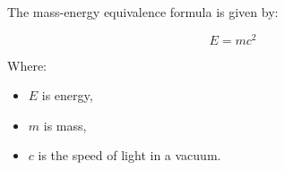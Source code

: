 \documentclass{article}
\begin{document}
The mass-energy equivalence formula is given by:

\begin{equation}
E = mc^2
\end{equation}

Where:
\begin{itemize}
    \item $E$ is energy,
    \item $m$ is mass,
    \item $c$ is the speed of light in a vacuum.
\end{itemize}
\end{document}
